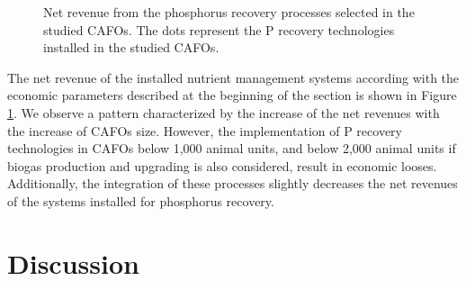 \begin{refsection}[referencesCh4]
\begin{figure}[h]
	\caption{Net revenue from the phosphorus recovery processes selected in the studied CAFOs. The dots represent the P recovery technologies installed in the studied CAFOs.}
	\label{fig:NetRev_TechSelected}
\end{figure}

The net revenue of the installed nutrient management systems according with the economic parameters described at the beginning of the section is shown in Figure \ref{fig:NetRev_TechSelected}. We observe a pattern characterized by the increase of the net revenues with the increase of CAFOs size. However, the implementation of P recovery technologies in CAFOs below 1,000 animal units, and below 2,000 animal units if biogas production and upgrading is also considered, result in economic looses. Additionally, the integration of these processes slightly decreases the net revenues of the systems installed for phosphorus recovery.


\section{Discussion}

\end{refsection}
